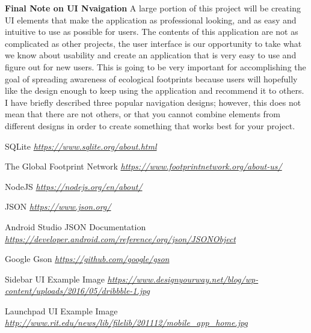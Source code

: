 \documentclass[onecolumn, draftclsnofoot,10pt, compsoc]{IEEEtran}
\begin{document}
\noindent \textbf{Final Note on UI Nvaigation}
A large portion of this project will be creating UI elements that make the application as professional looking, and as easy and intuitive to use as possible for users.
The contents of this application are not as complicated as other projects, the user interface is our opportunity to take what we know about usability and create an application that is very easy to use and figure out for new users. This is going to be very important for accomplishing the goal of spreading awareness of ecological footprints because users will hopefully like the design enough to keep using the application and recommend it to others. I have briefly described three popular navigation designs; however, this does not mean that there are not others, or that you cannot combine elements from different designs in order to create something that works best for your project.


\clearpage
 \begin{thebibliography}{1}

     SQLite  {\em \url{https://www.sqlite.org/about.html}} 

     The Global Footprint Network   {\em \url{https://www.footprintnetwork.org/about-us/}} 
    
     NodeJS   {\em \url{https://nodejs.org/en/about/}} 
    
     JSON   {\em \url{https://www.json.org/}} 
    
     Android Studio JSON Documentation   {\em \url{https://developer.android.com/reference/org/json/JSONObject }} 
    
     Google Gson {\em \url{https://github.com/google/gson}}
    
     Sidebar UI Example Image {\em \url{https://www.designyourway.net/blog/wp-content/uploads/2016/05/dribbble-1.jpg}}
    
     Launchpad UI Example Image {\em \url{ http://www.rit.edu/news/lib/filelib/201112/mobile_app_home.jpg}}
    
   

  \end{thebibliography}
\end{document}
